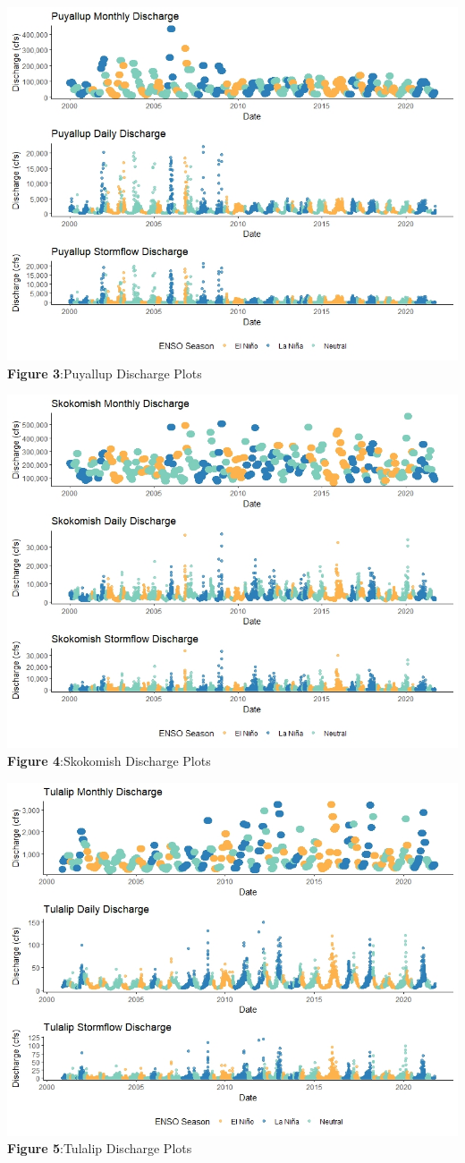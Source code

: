 \documentclass[
  12pt,
]{article}
\begin{document}
\includegraphics{Data/Processed/Plots/PuyallupPlots.jpeg} \textbf{Figure
3}:Puyallup Discharge Plots

\includegraphics{Data/Processed/Plots/SkokomishPlots.jpeg}
\textbf{Figure 4}:Skokomish Discharge Plots

\includegraphics{Data/Processed/Plots/TulalipPlots.jpeg} \textbf{Figure
5}:Tulalip Discharge Plots
\end{document}

